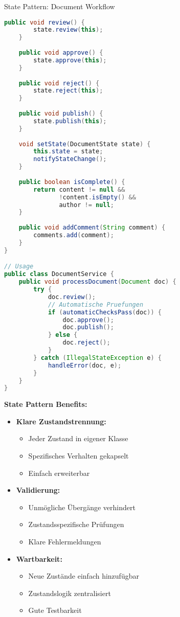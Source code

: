 \begin{example2}{State Pattern: Document Workflow}
\begin{lstlisting}[language=Java, style=basesmol]
    public void review() {
        state.review(this);
    }
    
    public void approve() {
        state.approve(this);
    }
    
    public void reject() {
        state.reject(this);
    }
    
    public void publish() {
        state.publish(this);
    }
    
    void setState(DocumentState state) {
        this.state = state;
        notifyStateChange();
    }
    
    public boolean isComplete() {
        return content != null && 
               !content.isEmpty() && 
               author != null;
    }
    
    public void addComment(String comment) {
        comments.add(comment);
    }
}

// Usage
public class DocumentService {
    public void processDocument(Document doc) {
        try {
            doc.review();
            // Automatische Pruefungen
            if (automaticChecksPass(doc)) {
                doc.approve();
                doc.publish();
            } else {
                doc.reject();
            }
        } catch (IllegalStateException e) {
            handleError(doc, e);
        }
    }
}
\end{lstlisting}

\textbf{State Pattern Benefits:}
\begin{itemize}
    \item \textbf{Klare Zustandstrennung:}
    \begin{itemize}
        \item Jeder Zustand in eigener Klasse
        \item Spezifisches Verhalten gekapselt
        \item Einfach erweiterbar
    \end{itemize}
    
    \item \textbf{Validierung:}
    \begin{itemize}
        \item Unmögliche Übergänge verhindert
        \item Zustandsspezifische Prüfungen
        \item Klare Fehlermeldungen
    \end{itemize}
    
    \item \textbf{Wartbarkeit:}
    \begin{itemize}
        \item Neue Zustände einfach hinzufügbar
        \item Zustandslogik zentralisiert
        \item Gute Testbarkeit
    \end{itemize}
\end{itemize}
\end{example2}

